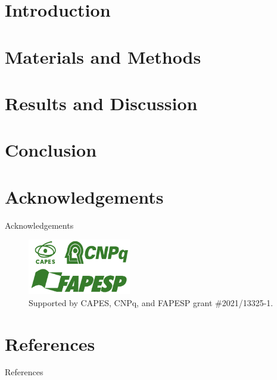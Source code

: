 \documentclass{beamer}
\begin{document}


\section{Introduction}


\section{Materials and Methods}


\section{Results and Discussion}



\section{Conclusion}


\section{Acknowledgements}
\begin{frame}{Acknowledgements}


    \begin{figure}
            \centering
            \includegraphics[width=0.4\textwidth]{beamerthemesrc/acknoledgements.png}
            \vspace{0.3cm}
            \caption{Supported by CAPES, CNPq, and FAPESP grant \#2021/13325-1.}
    \end{figure}
    
    
\end{frame}

\section{References}
\begin{frame}[allowframebreaks]{References}
    \vspace{0.1cm}
	\tiny
	
	
\end{frame}


\backmatter[notitle]
\end{document}
